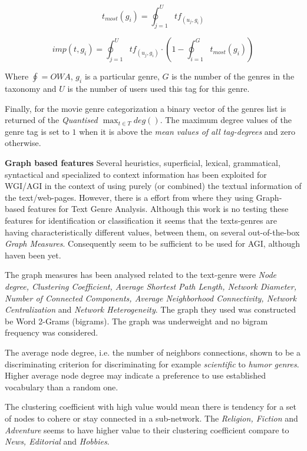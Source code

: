 \begin{equation}\label{chap:relevant_work:eq:fuzzy_movies_genre_eq3}
	t_{most}(g_{i}) = \oint_{j=1}^{U} tf_(u_{j},g_{i})
\end{equation}

\begin{equation}\label{chap:relevant_work:eq:fuzzy_movies_genre_eq4}
	imp(t,g_{i}) = \oint_{j=1}^{U} tf_(u_{j},g_{i}) \cdot (1 -  \oint_{i=1}^{G} t_{most}(g_{i}))
\end{equation}

Where $\oint=OWA$,  $g_{i}$ is a particular genre, $G$ is the number of the genres in the taxonomy and $U$ is the number of users used this tag for this genre.

Finally, for the movie genre categorization a binary vector of the genres list is returned of the \textit{Quantised  $\max_{t \in T} deg()$}. The maximum degree values of the genre tag is set to $1$ when it is above the \textit{mean values of all tag-degrees} and zero otherwise.

\textbf{Graph based features} Several heuristics, superficial, lexical, grammatical, syntactical and specialized to context information has been exploited for WGI/AGI in the context of using purely (or combined) the textual information of the text/web-pages. However, there is a effort from \parencite{nabhan2016graph} where they using Graph-based features for Text Genre Analysis. Although this work is no testing these features for identification or classification it seems that the texts-genres are having characteristically different values, between them, on several out-of-the-box \textit{Graph Measures}. Consequently seem to be sufficient to be used for AGI, although haven been yet.

The graph measures has been analysed related to the text-genre were \textit{Node degree, Clustering Coefficient, Average Shortest Path Length, Network Diameter, Number of Connected Components, Average Neighborhood Connectivity, Network Centralization} and \textit{Network Heterogeneity}. The graph they used was constructed be Word 2-Grams (bigrams). The graph was underweight and no bigram frequency was considered.  

The average node degree, i.e. the number of neighbors connections, shown  to be a discriminating criterion for discriminating for example \textit{scientific} to \textit{humor genres}. Higher average node degree may indicate a preference to use established vocabulary than a random one.

The clustering coefficient with high value would mean there is tendency for a set of nodes to cohere or stay connected in a sub-network. The \textit{Religion, Fiction} and \textit{Adventure} seems to have higher value to their clustering coefficient compare to \textit{News, Editorial} and \textit{Hobbies}. 

